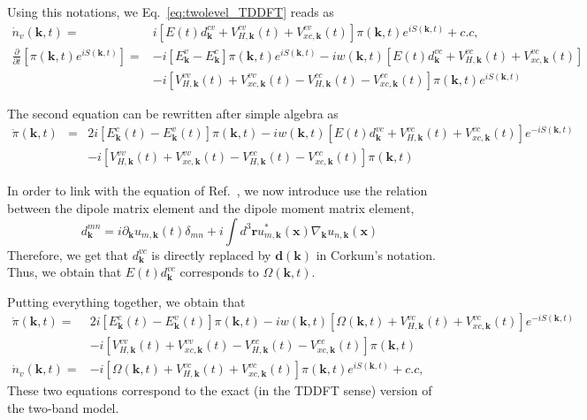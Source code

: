 \documentclass[a4paper,11pt]{report}
\renewcommand{\vec}[1]{\mathbf{#1}}
\begin{document}
Using this notations, we Eq.~\ref{eq:twolevel_TDDFT} reads as
\begin{subequations}
 \begin{align}
  \dot{n}_v(\vec{k},t) =& i[E(t)d^{cv}_{\vec{k}} +  V_{H,\vec{k}}^{cv}(t) +  V_{xc,\vec{k}}^{cv}(t)]\pi(\vec{k},t)e^{iS(\vec{k},t)} + c.c,\\
  \frac{\partial }{\partial t} [\pi(\vec{k},t)e^{iS(\vec{k},t)}] =& -i[E_\vec{k}^v-E_\vec{k}^c]\pi(\vec{k},t)e^{iS(\vec{k},t)} - i w(\vec{k},t)[E(t)d^{vc}_{\vec{k}}+V_{H,\vec{k}}^{vc}(t) +  V_{xc,\vec{k}}^{vc}(t)] \nonumber \\
   &-i[V_{H,\vec{k}}^{vv}(t) +  V_{xc,\vec{k}}^{vv}(t) - V_{H,\vec{k}}^{cc}(t) -  V_{xc,\vec{k}}^{cc}(t)]\pi(\vec{k},t)e^{iS(\vec{k},t)}
 \end{align}
 \label{eq:twolevel_TDDFT_2}
\end{subequations}

The second equation can be rewritten after simple algebra as
\begin{eqnarray}
   \dot{\pi}(\vec{k},t) &=& 2i[E_\vec{k}^c(t)-E_\vec{k}^v(t)]\pi(\vec{k},t)  - i w(\vec{k},t)[E(t)d^{vc}_{\vec{k}}+V_{H,\vec{k}}^{vc}(t) +  V_{xc,\vec{k}}^{vc}(t)]e^{-iS(\vec{k},t)} \nonumber \\
   &&-i[V_{H,\vec{k}}^{vv}(t) +  V_{xc,\vec{k}}^{vv}(t) - V_{H,\vec{k}}^{cc}(t) -  V_{xc,\vec{k}}^{cc}(t)]\pi(\vec{k},t)\nonumber
\end{eqnarray}

In order to link with the equation of  Ref.~\cite{PhysRevLett.113.073901}, we now introduce use the relation between the dipole matrix element and the dipole moment matrix element,
\begin{equation}
 d^{mn}_{\vec{k}} = i\partial_\vec{k} u_{m,\vec{k}}(t)\delta_{mn} + i\int d^3\vec{r} u^*_{m,\vec{k}}(\vec{x})\nabla_{\vec{k}}u_{n,\vec{k}}(\vec{x})\nonumber
\end{equation}
Therefore, we get that $d^{vc}_{\vec{k}}$ is directly replaced by $\vec{d}(\vec{k})$ in Corkum's notation.
Thus, we obtain that $E(t)d^{vc}_{\vec{k}}$ corresponds to $\Omega(\vec{k},t)$.

Putting everything together, we obtain that
\begin{subequations}
 \begin{align}
  \dot{\pi}(\vec{k},t) =& 2i[E_\vec{k}^c(t)-E_\vec{k}^v(t)]\pi(\vec{k},t)  - i w(\vec{k},t)[\Omega(\vec{k},t) +V_{H,\vec{k}}^{vc}(t) +  V_{xc,\vec{k}}^{vc}(t)]e^{-iS(\vec{k},t)} \nonumber \\
   &-i[V_{H,\vec{k}}^{vv}(t) +  V_{xc,\vec{k}}^{vv}(t) - V_{H,\vec{k}}^{cc}(t) -  V_{xc,\vec{k}}^{cc}(t)]\pi(\vec{k},t)\\
   \dot{n}_v(\vec{k},t) =& -i[\Omega(\vec{k},t) +  V_{H,\vec{k}}^{vc}(t) +  V_{xc,\vec{k}}^{vc}(t)]\pi(\vec{k},t)e^{iS(\vec{k},t)} + c.c,
 \end{align}
 \label{eq:twolevel_TDDFT_3}
\end{subequations}
These two equations correspond to the exact (in the TDDFT sense) version of the two-band model. \\
\end{document}
